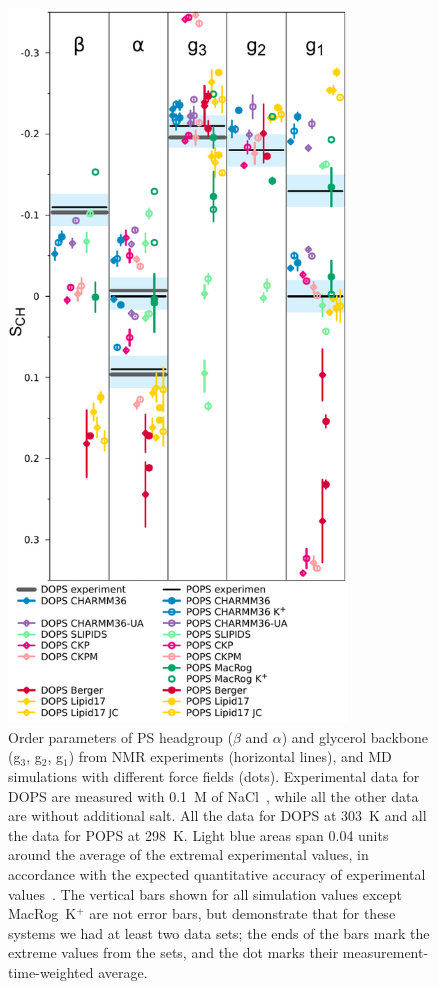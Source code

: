 \documentclass[aps,prl,superscriptaddress,twocolumn]{revtex4}
\begin{document}
\begin{figure}[]
  \centering
  \includegraphics[width=9.0cm]{../Figs/HGorderparametersPS.pdf}
  \caption{\label{HGorderParametersPS}
    Order parameters of PS headgroup ($\beta$ and $\alpha$) and
    glycerol backbone (g$_3$, g$_2$, g$_1$) from NMR experiments (horizontal lines),
    and MD simulations with different force fields (dots).
    Experimental data for DOPS are measured with 0.1~M of NaCl~\cite{browning80},
    while all the other data are without additional salt.
    All the data for DOPS at 303~K and all the data for POPS at 298~K.
    Light blue areas span 0.04 units around the average of the extremal experimental values,
    in accordance with the expected quantitative accuracy of experimental values~\cite{ollila16}.
    The vertical bars shown for all simulation values except MacRog~K$^+$
    are not error bars, but demonstrate that for these systems
    we had at least two data sets; the ends of the bars mark the extreme values
    from the sets, and the dot marks their measurement-time-weighted average.
  }
\end{figure}
\end{document}
